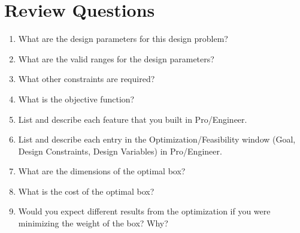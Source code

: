 \documentclass[12pt]{article}
\begin{document}
\section*{Review Questions}
\begin{enumerate}
	\item What are the design parameters for this design problem?
	\vspace{1.25in}
	\item What are the valid ranges for the design parameters?
	\vspace{1.25in}
	\item What other constraints are required?
	\vspace{1.25in}
	\item What is the objective function?
	\vspace{1.25in}
	\item List and describe each feature that you built in Pro/Engineer.
	\pagebreak
	\item List and describe each entry in the Optimization/Feasibility window (Goal, Design Constraints, Design Variables) in Pro/Engineer.
	\vspace{2.5in}
	\item What are the dimensions of the optimal box?
	\vspace{1.25in}
	\item What is the cost of the optimal box?
	\vspace{1.25in}
	\item Would you expect different results from the optimization if you were minimizing the weight of the box? Why?
\end{enumerate}
\end{document}
